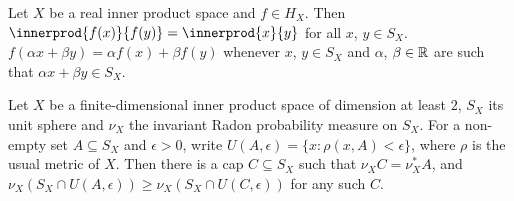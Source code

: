  Let $X$ be a real inner product space and
$f\in H_X$.
Then $\innerprod{f(x)}{f(y)}=\innerprod{x}{y}$ for all $x$, $y\in S_X$.
 $f(\alpha x+\beta y)=\alpha f(x)+\beta f(y)$
whenever $x$, $y\in S_X$ and $\alpha$, $\beta\in\Bbb R$ are such that
$\alpha x+\beta y\in S_X$.


 Let $X$ be a finite-dimensional inner product
space of dimension at least $2$, $S_X$ its unit sphere and $\nu_X$ the
invariant Radon probability measure on $S_X$.   For a non-empty set
$A\subseteq S_X$ and $\epsilon>0$, write
$U(A,\epsilon)=\{x:\rho(x,A)<\epsilon\}$, where $\rho$ is
the usual metric of $X$.   Then there is a cap $C\subseteq S_X$ such
that $\nu_XC=\nu_X^*A$, and
$\nu_X(S_X\cap U(A,\epsilon))\ge\nu_X(S_X\cap U(C,\epsilon))$
for any such $C$.

